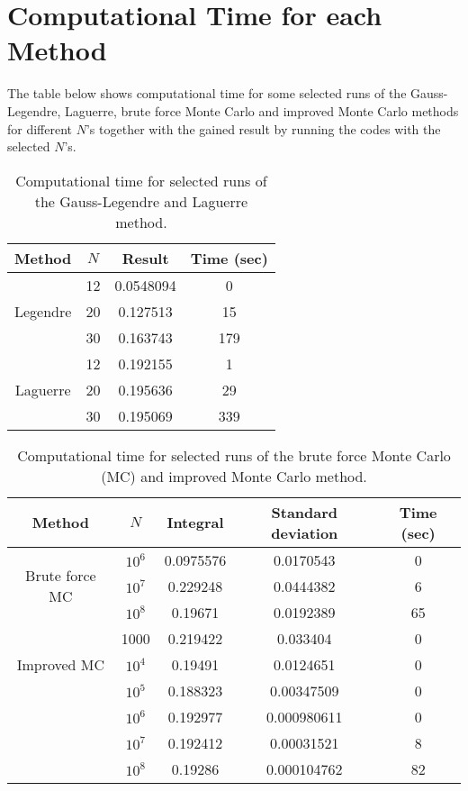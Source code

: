 \section{Computational Time for each Method}
\label{sec:ComputationalTime}
The table below shows computational time for some selected runs of the Gauss-Legendre, Laguerre, brute force Monte Carlo and improved Monte Carlo methods for different $N$'s together with the gained result by running the codes with the selected $N$'s. 
\begin{table}[ht]
\centering
\caption{Computational time for selected runs of the Gauss-Legendre and Laguerre method.}
\begin{center}
\begin{tabular}{|c|c|c|c|}
    \hline
    Method & $N$ & Result & Time (sec)
    \\
    \hline
    \multirow{3}{*}{Legendre}
    & 12 & 0.0548094  &  0 
    \\
    & 20 & 0.127513 & 15
    \\
    & 30 & 0.163743 & 179
    \\
    \hline
    \multirow{3}{*}{Laguerre}
    & 12 & 0.192155 &  1
    \\
    & 20 & 0.195636 & 29
    \\
    & 30 & 0.195069 & 339
    \\
    \hline
\end{tabular}
\end{center}
\label{tab:multicol}
\end{table}

\begin{table}[ht]
\centering
\caption{Computational time for selected runs of the brute force Monte Carlo (MC) and improved Monte Carlo method.}
\begin{center}
\begin{tabular}{|c|c|c|c|c|}
	\hline
    Method & $N$ & Integral & Standard deviation & Time (sec)
    \\    
    \hline
    \multirow{3}{*}{Brute force MC}
    & $10^6$ & 0.0975576 & 0.0170543 & 0
    \\
    & $10^7$ & 0.229248 & 0.0444382 & 6
    \\
    & $10^8$ & 0.19671 & 0.0192389 & 65 
    \\
    \hline
	\multirow{3}{*}{Improved MC}
	& 1000 & 0.219422 & 0.033404 & 0  
    \\
    & $10^4$ & 0.19491 & 0.0124651 & 0
    \\
    & $10^5$ & 0.188323 & 0.00347509 & 0
    \\
    & $10^6$ & 0.192977 & 0.000980611 & 0
    \\
    & $10^7$ & 0.192412 & 0.00031521 & 8
    \\
    & $10^8$ & 0.19286 & 0.000104762 & 82
    \\
    \hline
\end{tabular}
\end{center}
\label{tab:multicol}
\end{table}